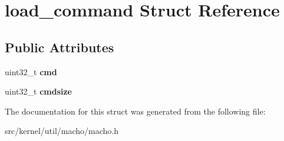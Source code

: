 \hypertarget{structload__command}{}\section{load\+\_\+command Struct Reference}
\label{structload__command}
\subsection*{Public Attributes}
\begin{DoxyCompactItemize}
\item 
\mbox{\label{structload__command_a5c9d9e0db5e52a3538da897464ae9a80}} 
uint32\+\_\+t {\bfseries cmd}
\item 
\mbox{\label{structload__command_a2619cd99f42f7734867e4c42d20bf48d}} 
uint32\+\_\+t {\bfseries cmdsize}
\end{DoxyCompactItemize}


The documentation for this struct was generated from the following file\+:\begin{DoxyCompactItemize}
\item 
src/kernel/util/macho/macho.\+h\end{DoxyCompactItemize}
